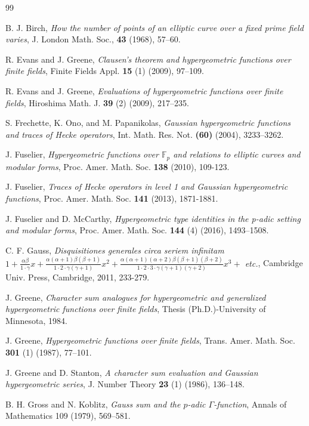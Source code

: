 \documentclass[12pt]{amsart}
\theoremstyle{plain}
\theoremstyle{definition}
\theoremstyle{remark}
\newcommand{\F}{\mathbb{F}}
\numberwithin{equation}{section}
\begin{document}
\begin{thebibliography}{99}
		
		B. J. Birch, {\it How the number of points of an elliptic curve over a fixed prime field varies}, J. London Math. Soc., {\bf 43} (1968), 57--60.
		
		R. Evans and J. Greene, \emph{Clausen’s theorem and hypergeometric functions
over finite fields}, Finite Fields Appl. \textbf{15} (1) (2009), 97--109.

 R. Evans and J. Greene, \emph{Evaluations of hypergeometric functions over
finite fields}, Hiroshima Math. J. \textbf{39} (2) (2009), 217--235.
					
		S. Frechette, K. Ono, and M. Papanikolas, {\it Gaussian hypergeometric functions and traces of Hecke operators}, Int. Math. Res. Not. {\bf (60)} (2004), 3233--3262.
		
		 J. Fuselier, \emph{Hypergeometric functions over $\F_p$ and relations to elliptic curves and modular forms},
		Proc. Amer. Math. Soc. \textbf{138} (2010), 109-123.
		
		 J. Fuselier, \emph{Traces of Hecke operators in level 1 and Gaussian hypergeometric functions},
		Proc. Amer. Math. Soc. \textbf{141} (2013), 1871-1881.
		
		 J. Fuselier and D. McCarthy, \emph{Hypergeometric type identities in the p-adic setting and modular forms}, Proc. Amer. Math. Soc. \textbf{144} (4) (2016), 1493--1508.
				
		C. F. Gauss, {\it Disquisitiones generales circa seriem infinitam $1+\frac{\alpha\beta}{1\cdot\gamma}x
			+\frac{\alpha(\alpha+1)\beta(\beta+1)}{1\cdot2\cdot\gamma(\gamma+1)}x^2
			+\frac{\alpha(\alpha+1)(\alpha+2)\beta(\beta+1)(\beta+2)}{1\cdot2\cdot3\cdot\gamma(\gamma+1)(\gamma+2)}x^3+$ etc.}, Cambridge Univ. Press, Cambridge, 2011, 233-279.
		
		 J. Greene, \emph{Character sum analogues for hypergeometric and generalized hypergeometric functions over finite fields}, Thesis (Ph.D.)-University of Minnesota, 1984.
		
		J. Greene, {\it Hypergeometric functions over finite fields}, Trans. Amer. Math. Soc. {\bf 301} (1) (1987), 77--101.
		
		J. Greene and D. Stanton, \emph{A character sum evaluation and Gaussian hypergeometric series}, J. Number Theory \textbf{23} (1) (1986), 136--148.
				
				
				B. H. Gross and N. Koblitz, {\it Gauss sum and the $p$-adic $\Gamma$-function}, Annals of Mathematics 109 (1979), 569--581.


\end{thebibliography}
\end{document}
